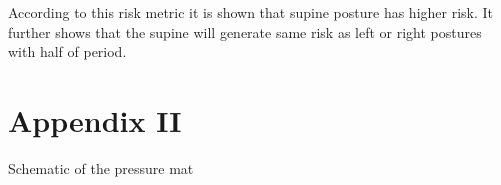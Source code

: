 According to this risk metric it is shown that supine posture has higher risk. It further shows that the supine will generate same risk as left or right postures with half of period.

\chapter*{Appendix II}
\label{chapter:appendix2}

Schematic of the pressure mat



% 




